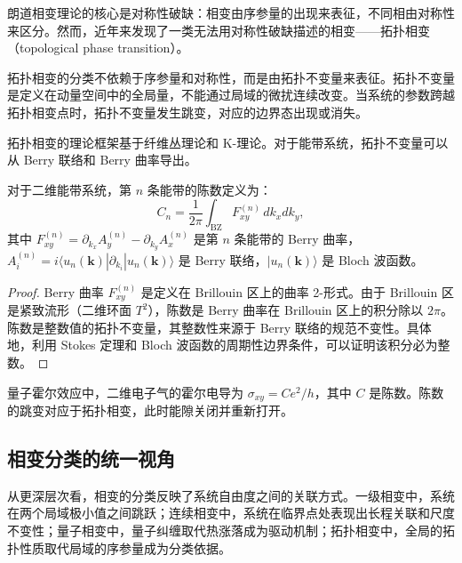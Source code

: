朗道相变理论的核心是对称性破缺：相变由序参量的出现来表征，不同相由对称性来区分。然而，近年来发现了一类无法用对称性破缺描述的相变——拓扑相变（topological phase transition）。

\begin{definition}[拓扑相变]
拓扑相变的分类不依赖于序参量和对称性，而是由拓扑不变量来表征。拓扑不变量是定义在动量空间中的全局量，不能通过局域的微扰连续改变。当系统的参数跨越拓扑相变点时，拓扑不变量发生跳变，对应的边界态出现或消失。
\end{definition}

拓扑相变的理论框架基于纤维丛理论和 K-理论。对于能带系统，拓扑不变量可以从 Berry 联络和 Berry 曲率导出。

\begin{theorem}[陈数公式]
对于二维能带系统，第 $n$ 条能带的陈数定义为：
\begin{equation}
    C_n = \frac{1}{2\pi} \int_{\text{BZ}} F^{(n)}_{xy} \, dk_x dk_y,
\end{equation}
其中 $F^{(n)}_{xy} = \partial_{k_x} A^{(n)}_y - \partial_{k_y} A^{(n)}_x$ 是第 $n$ 条能带的 Berry 曲率，$A^{(n)}_i = i\langle u_n(\mathbf{k}) | \partial_{k_i} | u_n(\mathbf{k}) \rangle$ 是 Berry 联络，$|u_n(\mathbf{k})\rangle$ 是 Bloch 波函数。
\end{theorem}

\begin{proof}
Berry 曲率 $F^{(n)}_{xy}$ 是定义在 Brillouin 区上的曲率 2-形式。由于 Brillouin 区是紧致流形（二维环面 $T^2$），陈数是 Berry 曲率在 Brillouin 区上的积分除以 $2\pi$。陈数是整数值的拓扑不变量，其整数性来源于 Berry 联络的规范不变性。具体地，利用 Stokes 定理和 Bloch 波函数的周期性边界条件，可以证明该积分必为整数。
\end{proof}

\begin{example}
量子霍尔效应中，二维电子气的霍尔电导为 $\sigma_{xy} = C e^2/h$，其中 $C$ 是陈数。陈数的跳变对应于拓扑相变，此时能隙关闭并重新打开。
\end{example}

\subsection{相变分类的统一视角}

\begin{remark}
从更深层次看，相变的分类反映了系统自由度之间的关联方式。一级相变中，系统在两个局域极小值之间跳跃；连续相变中，系统在临界点处表现出长程关联和尺度不变性；量子相变中，量子纠缠取代热涨落成为驱动机制；拓扑相变中，全局的拓扑性质取代局域的序参量成为分类依据。
\end{remark}

